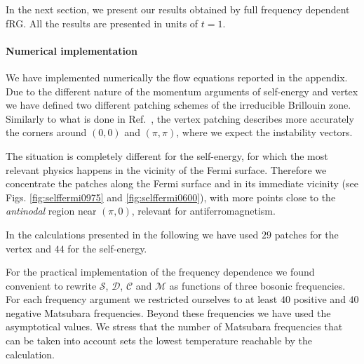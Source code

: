 In the next section, we present our results obtained by full frequency dependent fRG. All the results are presented in units of $t=1$.  
\paragraph*{Numerical implementation}
We have implemented numerically the flow equations reported in the appendix. 
Due to the different nature of the momentum arguments of self-energy and vertex we have defined two different patching schemes of the irreducible Brillouin zone. 
Similarly to what is done in Ref.~, the vertex patching describes more accurately the corners around $(0,0)$ and $(\pi,\pi)$, where we expect the instability vectors.

The situation is completely different for the self-energy, for which the most relevant physics happens in the vicinity of the Fermi surface.
Therefore we concentrate the patches along the Fermi surface and in its immediate vicinity (see Figs. \ref{fig:selffermi0975} and \ref{fig:selffermi0600}), with more points close to the \textit{antinodal} region near $(\pi,0)$, relevant for antiferromagnetism.

In the calculations presented in the following we have used $29$ patches for the vertex and $44$ for the self-energy.

For the practical implementation of the frequency dependence we found convenient to rewrite $\mathcal{S}$, $\mathcal{D}$, $\mathcal{C}$ and $\mathcal{M}$ as functions of three bosonic frequencies. 
For each frequency argument we restricted ourselves to at least $40$ positive and $40$ negative Matsubara frequencies. Beyond these frequencies we have used the asymptotical values. 
We stress that the number of Matsubara frequencies that can be taken into account sets the lowest temperature reachable by the calculation.


